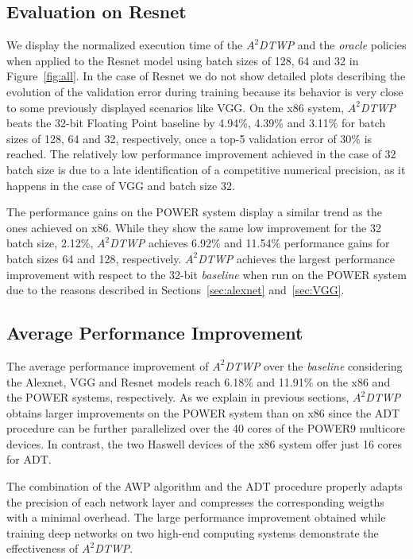 \subsection{Evaluation on Resnet}
\label{sec:Resnet}
We display the normalized execution time of the \textit{$A^2$DTWP} and the 
\textit{oracle} policies when applied to the Resnet model using batch sizes of 
128, 64 and 32 in Figure~\ref{fig:all}.
In the case of Resnet we do not show detailed plots describing the evolution of 
the validation error during training because its behavior is very close to some 
previously displayed scenarios like VGG.
On the x86 system, \textit{$A^2$DTWP} beats the 32-bit Floating Point baseline 
by 4.94\%, 4.39\% and 3.11\% for batch sizes of 128, 64 and 32, respectively, 
once a top-5 validation error of 30\% is reached.
The relatively low performance improvement achieved in the case of 32 batch size 
is due to a late identification of a competitive numerical precision, as it 
happens in the case of VGG and batch size 32.

The performance gains on the POWER system display a similar trend as the ones 
achieved on x86.  While they show the same low improvement for the 32 batch 
size, 2.12\%, \textit{$A^2$DTWP} achieves 6.92\% and 11.54\% performance gains 
for batch sizes 64 and 128, respectively.
\textit{$A^2$DTWP} achieves the largest performance improvement with respect to 
the 32-bit \textit{baseline} when run on the POWER system due to the reasons 
described in Sections~\ref{sec:alexnet} and~\ref{sec:VGG}.

\subsection{Average Performance Improvement}
\label{sec:Average}
The average performance improvement of \textit{$A^2$DTWP} over the 
\textit{baseline} considering the Alexnet, VGG and Resnet models reach 6.18\% 
and 11.91\% on the x86 and the POWER systems, respectively.  As we explain in 
previous sections, \textit{$A^2$DTWP} obtains larger improvements on the POWER 
system than on  x86 since the ADT procedure can be further parallelized over the 
40 cores of the POWER9 multicore devices.
In contrast, the two Haswell devices of the x86 system offer just 16 cores for 
ADT.

The combination of the AWP algorithm and the ADT procedure properly adapts the 
precision of each network layer and compresses the corresponding weigths with a 
minimal overhead.
The large performance improvement obtained while training deep networks on two 
high-end computing systems demonstrate the effectiveness of \textit{$A^2$DTWP}.

